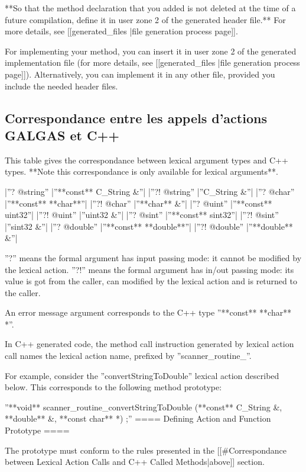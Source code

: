 **So that the method declaration that you added is not deleted at the time of a future compilation, define it in user zone 2 of the generated header file.** For more details, see [[generated\_files |file generation process page]].

For implementing your method, you can insert it in user zone 2 of the generated implementation file (for more details, see [[generated\_files |file generation process page]]). Alternatively, you can implement it in any other file, provided you include the needed header files.

\subsection{Correspondance entre les appels d'actions GALGAS et C++}

This table gives the correspondance between lexical argument types and C++ types. **Note this correspondance is only available for lexical arguments**.

|''? @string''  |''**const** C\_String \&''|
|''?! @string''  |''C\_String \&''|
|''? @char''  |''**const** **char**''|
|''?! @char''  |''**char** \&''|
|''? @uint''  |''**const** uint32''|
|''?! @uint''  |''uint32 \&''|
|''? @sint''  |''**const** sint32''|
|''?! @sint''  |''sint32 \&''|
|''? @double''  |''**const** **double**''|
|''?! @double''  |''**double** \&''|

''?'' means the formal argument has input passing mode: it cannot be modified by the lexical action. ''?!'' means the formal argument has in/out passing mode: its value is got from the caller, can modified by the lexical action and is returned to the caller.

An error message argument corresponds to the C++ type ''**const** **char** *''.

In C++ generated code, the method call instruction generated by lexical action call names the lexical action name, prefixed by ''scanner\_routine\_''.

For example, consider the ''convertStringToDouble'' lexical action described below. This corresponds to the following method prototype:

''**void** scanner\_routine\_convertStringToDouble (**const** C\_String \&, **double** \&, **const char** *) ;''
==== Defining Action and Function Prototype ====

The prototype must conform to the rules presented in the [[\#Correspondance between Lexical Action Calls and C++ Called Methods|above]] section.

